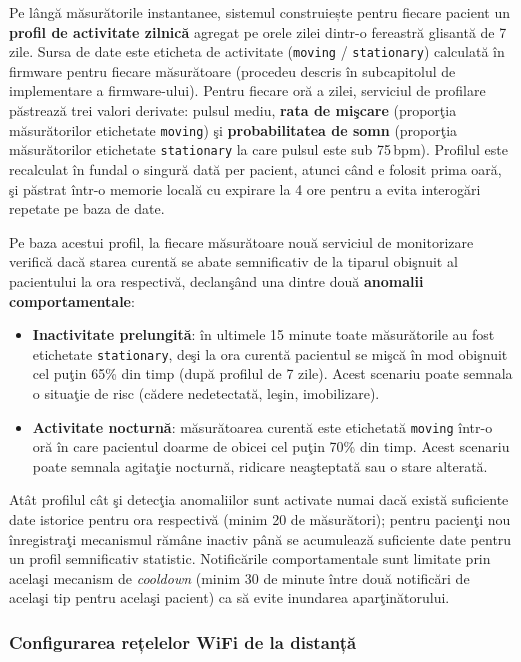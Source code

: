 ﻿\documentclass[12pt,a4paper,twoside]{article}
\begin{document}
Pe lângă măsurătorile instantanee, sistemul construiește pentru fiecare pacient un \textbf{profil de activitate zilnică} agregat pe orele zilei dintr-o fereastră glisantă de 7 zile. Sursa de date este eticheta de activitate (\texttt{moving} / \texttt{stationary}) calculată în firmware pentru fiecare măsurătoare (procedeu descris în subcapitolul de implementare a firmware-ului). Pentru fiecare oră a zilei, serviciul de profilare păstrează trei valori derivate: pulsul mediu, \textbf{rata de mişcare} (proporţia măsurătorilor etichetate \texttt{moving}) şi \textbf{probabilitatea de somn} (proporţia măsurătorilor etichetate \texttt{stationary} la care pulsul este sub 75\,bpm). Profilul este recalculat în fundal o singură dată per pacient, atunci când e folosit prima oară, şi păstrat într-o memorie locală cu expirare la 4 ore pentru a evita interogări repetate pe baza de date.

Pe baza acestui profil, la fiecare măsurătoare nouă serviciul de monitorizare verifică dacă starea curentă se abate semnificativ de la tiparul obişnuit al pacientului la ora respectivă, declanşând una dintre două \textbf{anomalii comportamentale}:

\begin{itemize}[leftmargin=1.5em]
\item \textbf{Inactivitate prelungită}: în ultimele 15 minute toate măsurătorile au fost etichetate \texttt{stationary}, deşi la ora curentă pacientul se mişcă în mod obişnuit cel puţin 65\% din timp (după profilul de 7 zile). Acest scenariu poate semnala o situaţie de risc (cădere nedetectată, leşin, imobilizare).
\item \textbf{Activitate nocturnă}: măsurătoarea curentă este etichetată \texttt{moving} într-o oră în care pacientul doarme de obicei cel puţin 70\% din timp. Acest scenariu poate semnala agitaţie nocturnă, ridicare neaşteptată sau o stare alterată.
\end{itemize}

Atât profilul cât şi detecţia anomaliilor sunt activate numai dacă există suficiente date istorice pentru ora respectivă (minim 20 de măsurători); pentru pacienţi nou înregistraţi mecanismul rămâne inactiv până se acumulează suficiente date pentru un profil semnificativ statistic. Notificările comportamentale sunt limitate prin acelaşi mecanism de \textit{cooldown} (minim 30 de minute între două notificări de acelaşi tip pentru acelaşi pacient) ca să evite inundarea aparţinătorului.

\subsubsection{Configurarea rețelelor WiFi de la distanță}
\end{document}
